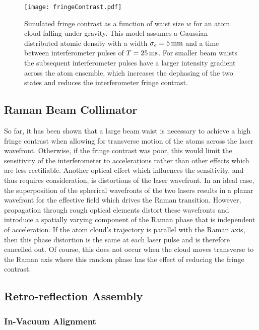 \begin{figure}[h!]
    \centering
    \texttt{[image: fringeContrast.pdf]}
    \caption[Simulated fringe contrast vs beam waist size]{Simulated fringe contrast as a function of waist size \(w\) for an atom cloud falling under gravity. This model assumes a Gaussian distributed atomic density with a width \(\sigma_c = \sivalue{5}{\milli\metre}\) and a time between interferometer pulses of \(T = \sivalue{25}{\milli\second}\). For smaller beam waists the subsequent interferometer pulses have a larger intensity gradient across the atom ensemble, which increases the dephasing of the two states and reduces the interferometer fringe contrast.}
    \label{fig:raman_fringecontrast}
\end{figure}

\subsection{Raman Beam Collimator}\label{subsec:setup_ramancollimator}
So far, it has been shown that a large beam waist is necessary to achieve a high fringe contrast when allowing for transverse motion of the atoms across the laser wavefront. Otherwise, if the fringe contrast was poor, this would limit the sensitivity of the interferometer to accelerations rather than other effects which are less rectifiable. Another optical effect which influences the sensitivity, and thus requires consideration, is distortions of the laser wavefront. In an ideal case, the superposition of the spherical wavefronts of the two lasers results in a planar wavefront for the effective field which drives the Raman transition. However, propagation through rough optical elements distort these wavefronts and introduce a spatially varying component of the Raman phase that is independent of acceleration. If the atom cloud's trajectory is parallel with the Raman axis, then this phase distortion is the same at each laser pulse and is therefore cancelled out. Of course, this does not occur when the cloud moves transverse to the Raman axis where this random phase has the effect of reducing the fringe contrast. 
\subsection{Retro-reflection Assembly}\label{subsec:setup_ramanmirror}
\subsubsection{In-Vacuum Alignment}

